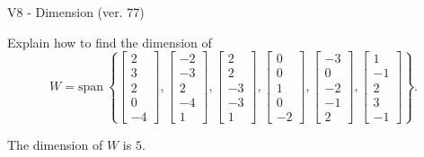 \begin{exercise}
  \begin{exerciseTitle}V8 - Dimension (ver. 77)\end{exerciseTitle}
  \begin{exerciseStatement}
    Explain how to find the dimension of 
\[W=\mathrm{span}\ \left\{\left[\begin{array}{r}
2 \\
3 \\
2 \\
0 \\
-4
\end{array}\right] , \left[\begin{array}{r}
-2 \\
-3 \\
2 \\
-4 \\
1
\end{array}\right] , \left[\begin{array}{r}
2 \\
2 \\
-3 \\
-3 \\
1
\end{array}\right] , \left[\begin{array}{r}
0 \\
0 \\
1 \\
0 \\
-2
\end{array}\right] , \left[\begin{array}{r}
-3 \\
0 \\
-2 \\
-1 \\
2
\end{array}\right] , \left[\begin{array}{r}
1 \\
-1 \\
2 \\
3 \\
-1
\end{array}\right]\right\}.\]



  \end{exerciseStatement}
  \begin{exerciseAnswer}
   The dimension of \(W\) is  \(5\).
  


  \end{exerciseAnswer}
\end{exercise}